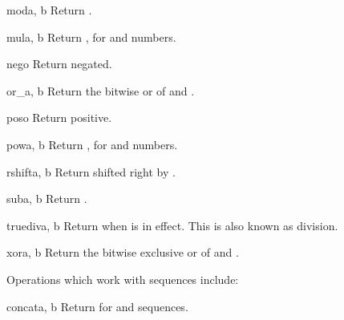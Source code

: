 \begin{funcdesc}{mod}{a, b}
Return  \code{\%} .
\end{funcdesc}

\begin{funcdesc}{mul}{a, b}
Return  \code{*} , for  and  numbers.
\end{funcdesc}

\begin{funcdesc}{neg}{o}
Return  negated.
\end{funcdesc}

\begin{funcdesc}{or_}{a, b}
Return the bitwise or of  and .
\end{funcdesc}

\begin{funcdesc}{pos}{o}
Return  positive.
\end{funcdesc}

\begin{funcdesc}{pow}{a, b}
Return  \code{**} , for  and  numbers.
\end{funcdesc}

\begin{funcdesc}{rshift}{a, b}
Return  shifted right by .
\end{funcdesc}

\begin{funcdesc}{sub}{a, b}
Return  \code{-} .
\end{funcdesc}

\begin{funcdesc}{truediv}{a, b}
Return  \code{/}  when  is in
effect.  This is also known as division.
\end{funcdesc}

\begin{funcdesc}{xor}{a, b}
Return the bitwise exclusive or of  and .
\end{funcdesc}


Operations which work with sequences include:

\begin{funcdesc}{concat}{a, b}
Return  \code{+}  for  and  sequences.
\end{funcdesc}

